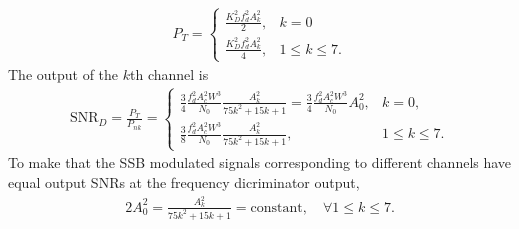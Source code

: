 \documentclass{assignment}
\begin{document}
\begin{sol}
\begin{itemize}
\begin{align}
            P_T=\left\{\begin{array}{ll}
                \frac{K_D^2f_d^2A_k^2}{2},&k=0\\
                \frac{K_D^2f_d^2A_k^2}{4},&1\leq k\leq 7.
            \end{array}\right.
        \end{align}
        The output of the $k$th channel is
        \begin{align}
            \text{SNR}_D=\frac{P_T}{P_{nk}}=\left\{\begin{array}{ll}
                \frac{3}{4}\frac{f_d^2A_c^2W^3}{N_0}\frac{A_k^2}{75k^2+15k+1}=\frac{3}{4}\frac{f_d^2A_c^2W^3}{N_0}A_0^2,&k=0,\\
                \frac{3}{8}\frac{f_d^2A_c^2W^3}{N_0}\frac{A_k^2}{75k^2+15k+1},&1\leq k\leq 7.
            \end{array}\right.
        \end{align}
        To make that the SSB modulated signals corresponding to different channels have equal output SNRs at the frequency dicriminator output,
        \begin{align}
            2A_0^2=\frac{A_k^2}{75k^2+15k+1}=\text{constant},\quad\forall 1\leq k\leq 7.
        \end{align}
    \end{itemize}
\end{sol}
\end{document}
